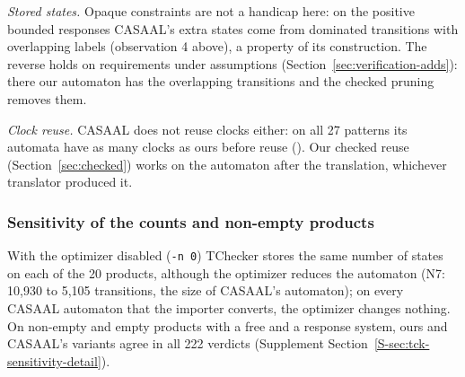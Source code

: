 \emph{Stored states.} Opaque constraints are not a handicap here: on the positive bounded responses CASAAL's extra states come from dominated transitions with overlapping labels (observation 4 above), a property of its construction. The reverse holds on requirements under assumptions (Section~\ref{sec:verification-adds}): there our automaton has the overlapping transitions and the checked pruning removes them.

\emph{Clock reuse.} CASAAL does not reuse clocks either: on all 27 patterns its automata have as many clocks as ours before reuse (). Our checked reuse (Section~\ref{sec:checked}) works on the automaton after the translation, whichever translator produced it.

\subsubsection{Sensitivity of the counts and non-empty products}
\label{sec:tck-sensitivity}
With the optimizer disabled (\texttt{-n 0}) TChecker stores the same number of states on each of the 20 products, although the optimizer reduces the automaton (N7: 10{,}930 to 5{,}105 transitions, the size of CASAAL's automaton); on every CASAAL automaton that the importer converts, the optimizer changes nothing.  On non-empty and empty products with a free and a response system, ours and CASAAL's variants agree in all 222 verdicts (Supplement Section~\ref{S-sec:tck-sensitivity-detail}).

